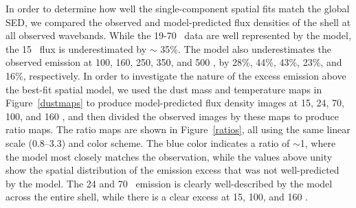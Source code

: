 \documentclass{emulateapj}
\begin{document}
\begin{figure*}
 
 
\caption{\label{dustmaps} Temperature map in units of Kelvin (left) and the dust mass surface density map in units of $\rm M_{\odot}$/pixel, where the pixel size is 3 (right), resulting from the fits to the individual pixels' 15-100 \micron\ SEDs, using the $\rm Mg_{0.7}SiO_{2.7}$ dust composition. The ``x" symbols represent the location of the O and B stars (those identified by \citet{koo08} in white and \citet{morris10} in green), while the black contours represent the X-ray PWN. The temperature map clearly shows that the dust temperature peaks around the stars, implying that these O and B stars are the primary heating sources for the dust. The distribution of the dust mass surface density does not show correlation with the stellar sources, but instead reveals a region of enhanced density at the western boundary of the PWN.}
\vspace{10mm}
\end{figure*}



In order to determine how well the single-component spatial fits match the global SED, we compared the observed and model-predicted flux densities of the shell at all observed wavebands. While the 19-70 \micron\ data are well represented by the model, the 15 \micron\ flux is underestimated by $\sim$ 35\%. The model also underestimates the observed emission at 100, 160, 250, 350, and 500 \micron, by 28\%, 44\%, 43\%, 23\%, and 16\%, respectively. In order to investigate the nature of the excess emission above the best-fit spatial model, we used the dust mass and temperature maps in Figure~\ref{dustmaps} to produce model-predicted flux density images at 15, 24, 70, 100, and 160 \micron, and then divided the observed images by these maps to produce ratio maps. The ratio maps are shown in Figure~\ref{ratios}, all using the same linear scale (0.8--3.3) and color scheme. The blue color indicates a ratio of $\sim$1, where the model most closely matches the observation, while the values above unity show the spatial distribution of the emission excess that was not well-predicted by the model. The 24 and 70 \micron\ emission is clearly well-described by the model across the entire shell, while there is a clear excess at 15, 100, and 160 \micron. 
\end{document}
